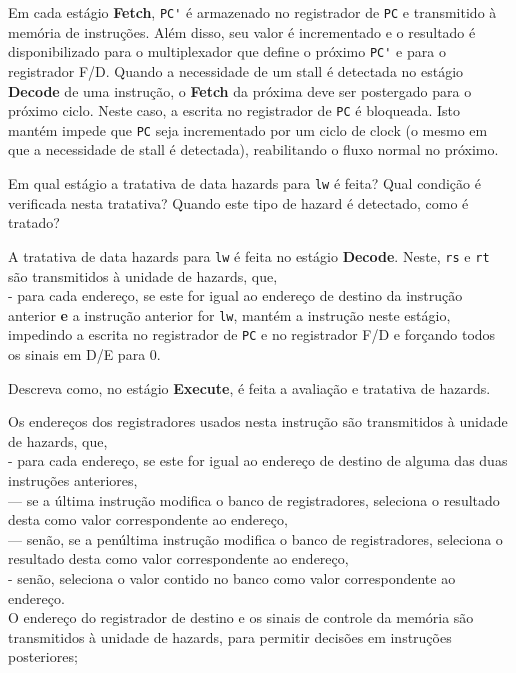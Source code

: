 \documentclass{article}
\begin{document}
\noindent Em cada estágio \textbf{Fetch}, \verb|PC'| é armazenado no registrador de \verb|PC| e transmitido à memória de instruções. Além disso, seu valor é incrementado e o resultado é disponibilizado para o multiplexador que define o próximo \verb|PC'| e para o registrador F/D. Quando a necessidade de um stall é detectada no estágio \textbf{Decode} de uma instrução, o \textbf{Fetch} da próxima deve ser postergado para o próximo ciclo. Neste caso, a escrita no registrador de \verb|PC| é bloqueada. Isto mantém impede que \verb|PC| seja incrementado por um ciclo de clock (o mesmo em que a necessidade de stall é detectada), reabilitando o fluxo normal no próximo.
\bigbreak

{\large Em qual estágio a tratativa de data hazards para \verb|lw| é feita? Qual condição é verificada nesta tratativa? Quando este tipo de hazard é detectado, como é tratado?\vspace{1mm}}

\noindent A tratativa de data hazards para \verb|lw| é feita no estágio \textbf{Decode}. Neste, \verb|rs| e \verb|rt| são transmitidos à unidade de hazards, que,\\
- para cada endereço, se este for igual ao endereço de destino da instrução anterior \textbf{e} a instrução anterior for \verb|lw|, mantém a instrução neste estágio, impedindo a escrita no registrador de \verb|PC| e no registrador F/D e forçando todos os sinais em D/E para 0.
\bigbreak

{\large Descreva como, no estágio \textbf{Execute}, é feita a avaliação e tratativa de hazards.\vspace{1mm}}

\noindent Os endereços dos registradores usados nesta instrução são transmitidos à unidade de hazards, que,\\
- para cada endereço, se este for igual ao endereço de destino de alguma das duas instruções anteriores,\\
--- se a última instrução modifica o banco de registradores, seleciona o resultado desta como valor correspondente ao endereço,\\
--- senão, se a penúltima instrução modifica o banco de registradores, seleciona o resultado desta como valor correspondente ao endereço,\\
- senão, seleciona o valor contido no banco como valor correspondente ao endereço.\\
O endereço do registrador de destino e os sinais de controle da memória são transmitidos à unidade de hazards, para permitir decisões em instruções posteriores;
\bigbreak
\end{document}
